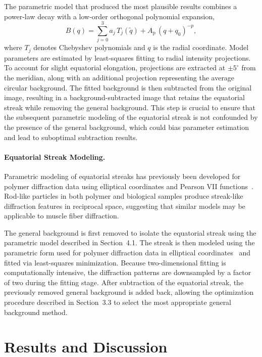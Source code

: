 \documentclass[iucr]{iucrjournals}
\begin{document}
The parametric model that produced the most plausible results combines a power-law decay with a low-order orthogonal polynomial expansion,
\begin{equation}
B(q) = \sum_{j=0}^{3} a_j\, T_j(\tilde q) + A_{\mathrm{p}}\, (q + q_0)^{-p},
\end{equation}
where $T_j$ denotes Chebyshev polynomials and $q$ is the radial coordinate. Model parameters are estimated by least-squares fitting to radial intensity projections. To account for slight equatorial elongation, projections are extracted at $\pm 5^{\circ}$ from the meridian, along with an additional projection representing the average circular background. The fitted background is then subtracted from the original image, resulting in a background-subtracted image that retains the equatorial streak while removing the general background. This step is crucial to ensure that the subsequent parametric modeling of the equatorial streak is not confounded by the presence of the general background, which could bias parameter estimation and lead to suboptimal subtraction results.

\paragraph{Equatorial Streak Modeling.}

Parametric modeling of equatorial streaks has previously been developed for polymer diffraction data using elliptical coordinates and Pearson VII functions~\cite{MurthyZeroGrubb1997}. Rod-like particles in both polymer and biological samples produce streak-like diffraction features in reciprocal space, suggesting that similar models may be applicable to muscle fiber diffraction.

The general background is first removed to isolate the equatorial streak using the parametric model described in Section~4.1. The streak is then modeled using the parametric form used for polymer diffraction data in elliptical coordinates~\cite{MurthyZeroGrubb1997} and fitted via least-squares minimization. Because two-dimensional fitting is computationally intensive, the diffraction patterns are downsampled by a factor of two during the fitting stage. After subtraction of the equatorial streak, the previously removed general background is added back, allowing the optimization procedure described in Section~3.3 to select the most appropriate general background method.


\section{Results and Discussion}
\end{document}
